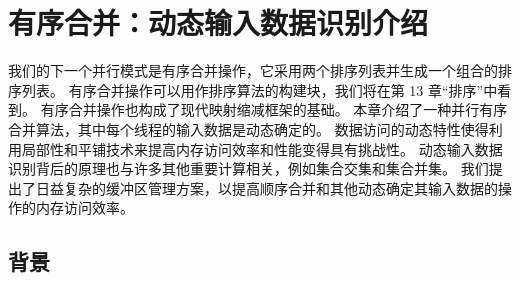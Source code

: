 \section{有序合并：动态输入数据识别介绍}
我们的下一个并行模式是有序合并操作，它采用两个排序列表并生成一个组合的排序列表。 有序合并操作可以用作排序算法的构建块，我们将在第 13 章“排序”中看到。 有序合并操作也构成了现代映射缩减框架的基础。 本章介绍了一种并行有序合并算法，其中每个线程的输入数据是动态确定的。 数据访问的动态特性使得利用局部性和平铺技术来提高内存访问效率和性能变得具有挑战性。 动态输入数据识别背后的原理也与许多其他重要计算相关，例如集合交集和集合并集。 我们提出了日益复杂的缓冲区管理方案，以提高顺序合并和其他动态确定其输入数据的操作的内存访问效率。

\subsection{背景}